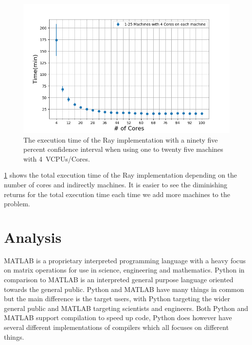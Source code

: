 \documentclass[12pt, a4paper]{article}
\begin{document}
\begin{figure}[H]
    \centering
    \includegraphics[width=1.0\textwidth, ]{pictures/CoresXTimeMinutesWhite.png}
    \caption{The execution time of the Ray implementation with a ninety five percent confidence interval when using one to twenty five machines with \SI{4}{VCPUs/Cores}.}
    \label{fig:CoresXTime}
\end{figure}

\cref{fig:CoresXTime} shows the total execution time of the Ray implementation depending on the number of cores and indirectly machines.
It is easier to see the diminishing returns for the total execution time each time we add more machines to the problem.


\section{Analysis}

MATLAB is a proprietary interpreted programming language with a heavy focus on matrix operations for use in science, engineering and mathematics.
Python in comparison to MATLAB is an interpreted general purpose language oriented towards the general public.
Python and MATLAB have many things in common but the main difference is the target users, with Python targeting the wider general public and MATLAB targeting scientists and engineers.
Both Python and MATLAB support compilation to speed up code, Python does however have several different implementations of compilers which all focuses on different things.
\end{document}

